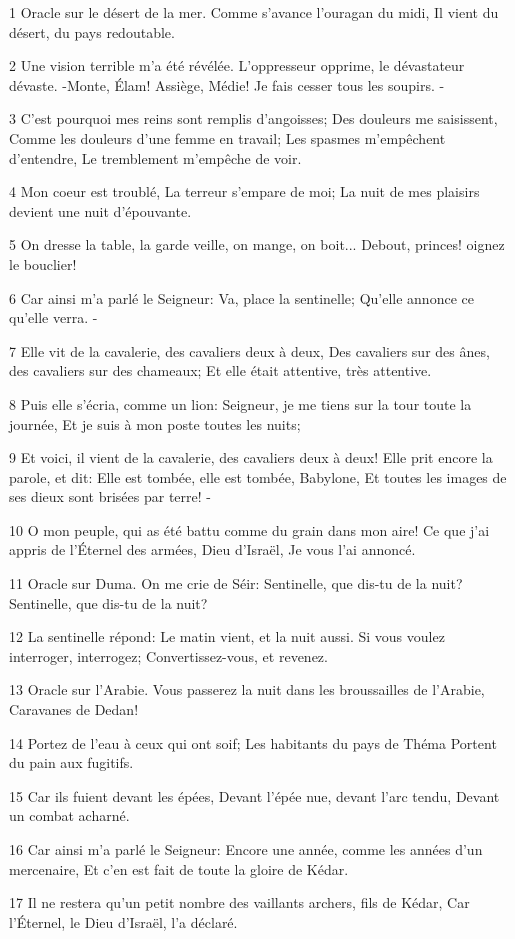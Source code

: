 \par 1 Oracle sur le désert de la mer. Comme s'avance l'ouragan du midi, Il vient du désert, du pays redoutable.
\par 2 Une vision terrible m'a été révélée. L'oppresseur opprime, le dévastateur dévaste. -Monte, Élam! Assiège, Médie! Je fais cesser tous les soupirs. -
\par 3 C'est pourquoi mes reins sont remplis d'angoisses; Des douleurs me saisissent, Comme les douleurs d'une femme en travail; Les spasmes m'empêchent d'entendre, Le tremblement m'empêche de voir.
\par 4 Mon coeur est troublé, La terreur s'empare de moi; La nuit de mes plaisirs devient une nuit d'épouvante.
\par 5 On dresse la table, la garde veille, on mange, on boit... Debout, princes! oignez le bouclier!
\par 6 Car ainsi m'a parlé le Seigneur: Va, place la sentinelle; Qu'elle annonce ce qu'elle verra. -
\par 7 Elle vit de la cavalerie, des cavaliers deux à deux, Des cavaliers sur des ânes, des cavaliers sur des chameaux; Et elle était attentive, très attentive.
\par 8 Puis elle s'écria, comme un lion: Seigneur, je me tiens sur la tour toute la journée, Et je suis à mon poste toutes les nuits;
\par 9 Et voici, il vient de la cavalerie, des cavaliers deux à deux! Elle prit encore la parole, et dit: Elle est tombée, elle est tombée, Babylone, Et toutes les images de ses dieux sont brisées par terre! -
\par 10 O mon peuple, qui as été battu comme du grain dans mon aire! Ce que j'ai appris de l'Éternel des armées, Dieu d'Israël, Je vous l'ai annoncé.
\par 11 Oracle sur Duma. On me crie de Séir: Sentinelle, que dis-tu de la nuit? Sentinelle, que dis-tu de la nuit?
\par 12 La sentinelle répond: Le matin vient, et la nuit aussi. Si vous voulez interroger, interrogez; Convertissez-vous, et revenez.
\par 13 Oracle sur l'Arabie. Vous passerez la nuit dans les broussailles de l'Arabie, Caravanes de Dedan!
\par 14 Portez de l'eau à ceux qui ont soif; Les habitants du pays de Théma Portent du pain aux fugitifs.
\par 15 Car ils fuient devant les épées, Devant l'épée nue, devant l'arc tendu, Devant un combat acharné.
\par 16 Car ainsi m'a parlé le Seigneur: Encore une année, comme les années d'un mercenaire, Et c'en est fait de toute la gloire de Kédar.
\par 17 Il ne restera qu'un petit nombre des vaillants archers, fils de Kédar, Car l'Éternel, le Dieu d'Israël, l'a déclaré.

